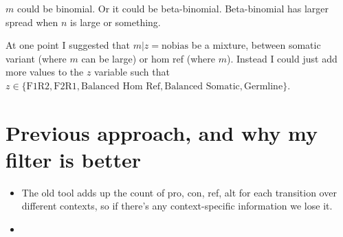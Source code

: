 \documentclass[a4paper]{article}
\begin{document}
$m$ could be binomial. Or it could be beta-binomial. Beta-binomial has larger spread when $n$ is large or something. 

At one point I suggested that $m|z = \mathrm{no bias}$ be a mixture, between somatic variant (where $m$ can be large) or hom ref (where $m$). Instead I could just add more values to the $z$ variable such that $z \in \{ \text{F1R2}, \text{F2R1}, \text{Balanced Hom Ref}, \text{Balanced Somatic}, \text{Germline} \}$.

\section{Previous approach, and why my filter is better}
\begin{itemize}
\item The old tool adds up the count of pro, con, ref, alt for each transition over different contexts, so if there's any context-specific information we lose it.
\item 
\end{itemize}
\end{document}
